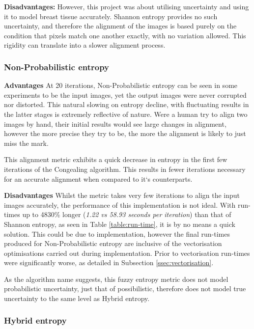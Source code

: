 \textbf{Disadvantages: }
However, this project was about utilising uncertainty and using it to model breast tissue accurately. Shannon entropy provides no such uncertainty, and therefore the alignment of the images is based purely on the condition that pixels match one another exactly, with no variation allowed. This rigidity can translate into a slower alignment process.

\subsubsection{Non-Probabilistic entropy}

\textbf{Advantages}
At 20 iterations, Non-Probabilistic entropy can be seen in some experiments to be  the input images, yet the output images were never corrupted nor distorted. This natural slowing on entropy decline, with fluctuating results in the latter stages is extremely reflective of nature. Were a human try to align two images by hand, their initial results would see large changes in alignment, however the more precise they try to be, the more the alignment is likely to just miss the mark.

This alignment metric exhibits a quick decrease in entropy in the first few iterations of the \Gls{Congealing} algorithm. This results in fewer iterations necessary for an accurate alignment when compared to it`s counterparts.

\noindent \textbf{Disadvantages}
Whilst the metric takes very few iterations to align the input images accurately, the performance of this implementation is not ideal. With run-times up to 4830\% longer (\textit{1.22 vs 58.93 seconds per iteration}) than that of Shannon entropy, as seen in Table \ref{table:run-time}, it is by no means a quick solution. This could be due to implementation, however the final run-times produced for Non-Probabilistic entropy are inclusive of the vectorisation optimisations carried out during implementation. Prior to vectorisation run-times were significantly worse, as detailed in Subsection \ref{ssec:vectorisation}.

As the algorithm name suggests, this fuzzy entropy metric does not model probabilistic uncertainty, just that of possibilistic, therefore does not model true uncertainty to the same level as Hybrid entropy.

\subsubsection{Hybrid entropy}

